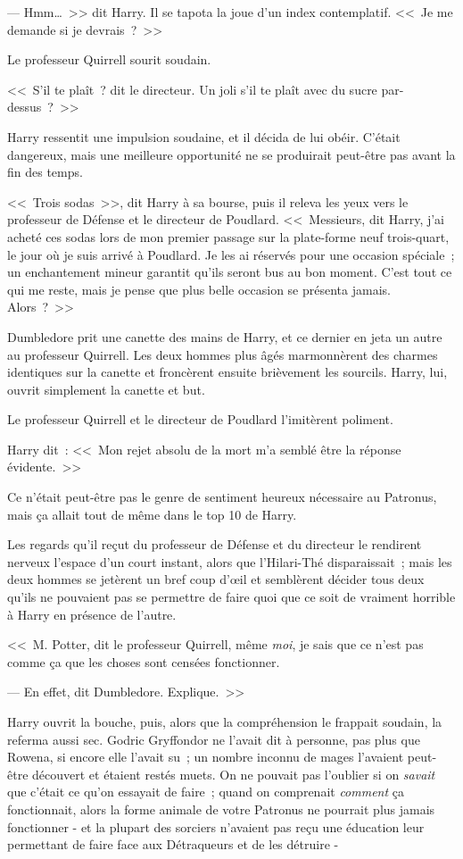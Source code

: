 --- Hmm…~>> dit Harry. Il se tapota la joue d'un index contemplatif. <<~Je me demande si je devrais~?~>>

Le professeur Quirrell sourit soudain.

<<~S'il te plaît~? dit le directeur. Un joli s'il te plaît avec du sucre par-dessus~?~>>

Harry ressentit une impulsion soudaine, et il décida de lui obéir. C'était dangereux, mais une meilleure opportunité ne se produirait peut-être pas avant la fin des temps.

<<~Trois sodas~>>, dit Harry à sa bourse, puis il releva les yeux vers le professeur de Défense et le directeur de Poudlard. <<~Messieurs, dit Harry, j'ai acheté ces sodas lors de mon premier passage sur la plate-forme neuf trois-quart, le jour où je suis arrivé à Poudlard. Je les ai réservés pour une occasion spéciale~; un enchantement mineur garantit qu'ils seront bus au bon moment. C'est tout ce qui me reste, mais je pense que plus belle occasion se présenta jamais. Alors~?~>>

Dumbledore prit une canette des mains de Harry, et ce dernier en jeta un autre au professeur Quirrell. Les deux hommes plus âgés marmonnèrent des charmes identiques sur la canette et froncèrent ensuite brièvement les sourcils. Harry, lui, ouvrit simplement la canette et but.

Le professeur Quirrell et le directeur de Poudlard l'imitèrent poliment.

Harry dit~: <<~Mon rejet absolu de la mort m'a semblé être la réponse évidente.~>>

Ce n'était peut-être pas le genre de sentiment heureux nécessaire au Patronus, mais ça allait tout de même dans le top 10 de Harry.

Les regards qu'il reçut du professeur de Défense et du directeur le rendirent nerveux l'espace d'un court instant, alors que l'Hilari-Thé disparaissait~; mais les deux hommes se jetèrent un bref coup d'œil et semblèrent décider tous deux qu'ils ne pouvaient pas se permettre de faire quoi que ce soit de vraiment horrible à Harry en présence de l'autre.

<<~M. Potter, dit le professeur Quirrell, même \emph{moi}, je sais que ce n'est pas comme ça que les choses sont censées fonctionner.

--- En effet, dit Dumbledore. Explique.~>>

Harry ouvrit la bouche, puis, alors que la compréhension le frappait soudain, la referma aussi sec. Godric Gryffondor ne l'avait dit à personne, pas plus que Rowena, si encore elle l'avait su~; un nombre inconnu de mages l'avaient peut-être découvert et étaient restés muets. On ne pouvait pas l'oublier si on \emph{savait} que c'était ce qu'on essayait de faire~; quand on comprenait \emph{comment} ça fonctionnait, alors la forme animale de votre Patronus ne pourrait plus jamais fonctionner - et la plupart des sorciers n'avaient pas reçu une éducation leur permettant de faire face aux Détraqueurs et de les détruire -

